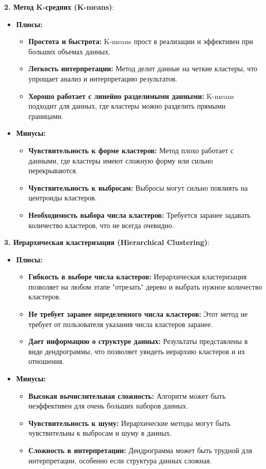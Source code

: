 \textbf{2. Метод K-средних (K-means)}:
\begin{itemize}
    \item \textbf{Плюсы:}
          \begin{itemize}
              \item \textbf{Простота и быстрота:} K-means прост в реализации и эффективен при больших объемах данных.
              \item \textbf{Легкость интерпретации:} Метод делит данные на четкие кластеры, что упрощает анализ и интерпретацию результатов.
              \item \textbf{Хорошо работает с линейно разделимыми данными:} K-means подходит для данных, где кластеры можно разделить прямыми границами.
          \end{itemize}
    \item \textbf{Минусы:}
          \begin{itemize}
              \item \textbf{Чувствительность к форме кластеров:} Метод плохо работает с данными, где кластеры имеют сложную форму или сильно перекрываются.
              \item \textbf{Чувствительность к выбросам:} Выбросы могут сильно повлиять на центроиды кластеров.
              \item \textbf{Необходимость выбора числа кластеров:} Требуется заранее задавать количество кластеров, что не всегда очевидно.
          \end{itemize}
\end{itemize}

\textbf{3. Иерархическая кластеризация (Hierarchical Clustering)}:
\begin{itemize}
    \item \textbf{Плюсы:}
          \begin{itemize}
              \item \textbf{Гибкость в выборе числа кластеров:} Иерархическая кластеризация позволяет на любом этапе "отрезать" дерево и выбрать нужное количество кластеров.
              \item \textbf{Не требует заранее определенного числа кластеров:} Этот метод не требует от пользователя указания числа кластеров заранее.
              \item \textbf{Дает информацию о структуре данных:} Результаты представлены в виде дендрограммы, что позволяет увидеть иерархию кластеров и их отношения.
          \end{itemize}
    \item \textbf{Минусы:}
          \begin{itemize}
              \item \textbf{Высокая вычислительная сложность:} Алгоритм может быть неэффективен для очень больших наборов данных.
              \item \textbf{Чувствительность к шуму:} Иерархические методы могут быть чувствительны к выбросам и шуму в данных.
              \item \textbf{Сложность в интерпретации:} Дендрограмма может быть трудной для интерпретации, особенно если структура данных сложная.
          \end{itemize}
\end{itemize}

